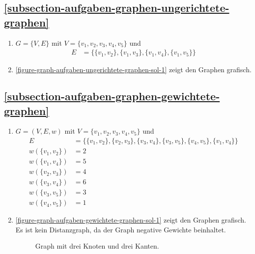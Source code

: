 \subsection*{\ref{subsection-aufgaben-graphen-ungerichtete-graphen} }

\begin{enumerate}
	\item $G = \{V, E \}$ mit $V = \{v_1, v_2, v_3, v_4, v_5\}$ und
\begin{align*}
E & = \{\{v_1, v_2\}, \{v_1, v_3\}, \{v_1, v_4\}, \{v_1, v_5\}\}
\end{align*}
	
	\item \autoref{figure-graph-aufgaben-ungerichtete-graphen-sol-1} zeigt den Graphen grafisch.

\end{enumerate}

\subsection*{\ref{subsection-aufgaben-graphen-gewichtete-graphen} }

\begin{enumerate}
	\item $G = (V, E, w)$ mit $V = \{v_1, v_2, v_3, v_4, v_5\}$ und
\begin{align*}
	E & =\{\{v_1, v_2\}, \{v_2, v_3\}, \{v_3, v_4\}, \{v_3, v_5\}, \{v_4, v_5\}, \{v_1, v_4\}\} \\
	w(\{v_1,v_2\}) & = 2 \\
	w(\{v_1,v_4\}) & = 5 \\
	w(\{v_2,v_3\}) & = 4 \\
	w(\{v_3,v_4\}) & = 6 \\
	w(\{v_3,v_5\}) & = 3 \\
	w(\{v_4,v_5\}) & = 1
\end{align*}
	
\item \autoref{figure-graph-aufgaben-gewichtete-graphen-sol-1} zeigt den Graphen grafisch. Es ist kein Distanzgraph, da der Graph negative Gewichte beinhaltet.

\begin{figure}[htb]
\centering
{}
\caption{Graph mit drei Knoten und drei Kanten.}
\label{figure-graph-aufgaben-gewichtete-graphen-sol-1}
\end{figure}

\end{enumerate}